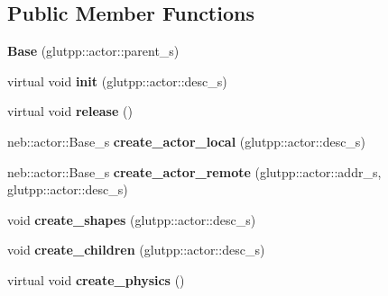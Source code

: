 \subsection*{Public Member Functions}
\begin{DoxyCompactItemize}
\item 
\hypertarget{classneb_1_1actor_1_1Base_a2476f443f7d6b8c60b3912953eec0842}{
{\bfseries Base} (glutpp::actor::parent\_\-s)}
\label{classneb_1_1actor_1_1Base_a2476f443f7d6b8c60b3912953eec0842}

\item 
\hypertarget{classneb_1_1actor_1_1Base_a972bd459843929bd090f093d215d540b}{
virtual void {\bfseries init} (glutpp::actor::desc\_\-s)}
\label{classneb_1_1actor_1_1Base_a972bd459843929bd090f093d215d540b}

\item 
\hypertarget{classneb_1_1actor_1_1Base_aee25af3cd56f3aec8a3e2db274bb0d1d}{
virtual void {\bfseries release} ()}
\label{classneb_1_1actor_1_1Base_aee25af3cd56f3aec8a3e2db274bb0d1d}

\item 
\hypertarget{classneb_1_1actor_1_1Base_a2f335051e5a6f833cad94da551bf9f82}{
neb::actor::Base\_\-s {\bfseries create\_\-actor\_\-local} (glutpp::actor::desc\_\-s)}
\label{classneb_1_1actor_1_1Base_a2f335051e5a6f833cad94da551bf9f82}

\item 
\hypertarget{classneb_1_1actor_1_1Base_a045e31459829bbbb5a49dccf0e7d9b67}{
neb::actor::Base\_\-s {\bfseries create\_\-actor\_\-remote} (glutpp::actor::addr\_\-s, glutpp::actor::desc\_\-s)}
\label{classneb_1_1actor_1_1Base_a045e31459829bbbb5a49dccf0e7d9b67}

\item 
\hypertarget{classneb_1_1actor_1_1Base_ae60a17296d6a2393c7662340673073a6}{
void {\bfseries create\_\-shapes} (glutpp::actor::desc\_\-s)}
\label{classneb_1_1actor_1_1Base_ae60a17296d6a2393c7662340673073a6}

\item 
\hypertarget{classneb_1_1actor_1_1Base_a1c6cb73654d5f395c86de63be1f25d1c}{
void {\bfseries create\_\-children} (glutpp::actor::desc\_\-s)}
\label{classneb_1_1actor_1_1Base_a1c6cb73654d5f395c86de63be1f25d1c}

\item 
\hypertarget{classneb_1_1actor_1_1Base_a70efd802d1530bf444a4a02a37e0c739}{
virtual void {\bfseries create\_\-physics} ()}
\label{classneb_1_1actor_1_1Base_a70efd802d1530bf444a4a02a37e0c739}


\end{DoxyCompactItemize}
